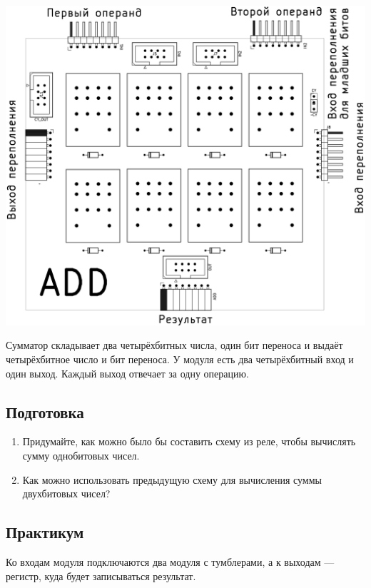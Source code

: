 \begin{center}
\includegraphics{boards/adder.png}
\end{center}

Сумматор складывает два четырёхбитных числа, один бит переноса и выдаёт четырёхбитное число и бит переноса.
У модуля есть два четырёхбитный вход и один выход.
Каждый выход отвечает за одну операцию.


\subsection{Подготовка}

\begin{enumerate}
    \item Придумайте, как можно было бы составить схему из реле, чтобы вычислять сумму однобитовых чисел.
    \item Как можно использовать предыдущую схему для вычисления суммы двухбитовых чисел?
\end{enumerate}

\subsection{Практикум}

Ко входам модуля подключаются два модуля с тумблерами, а к выходам --- регистр,
куда будет записываться результат.

